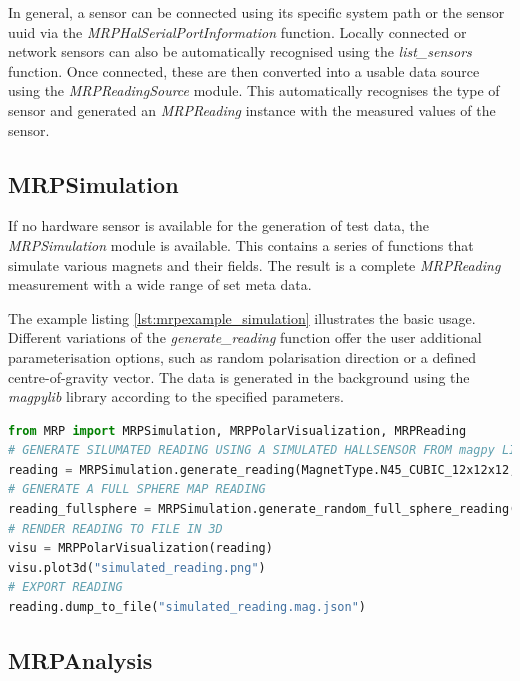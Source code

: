 In general, a sensor can be connected using its specific system path or
the sensor \gls{uuid} via the \emph{MRPHalSerialPortInformation}
function. Locally connected or network sensors can also be automatically
recognised using the \emph{list\_sensors} function. Once connected,
these are then converted into a usable data source using the
\emph{MRPReadingSource} module. This automatically recognises the type
of sensor and generated an \emph{MRPReading} instance with the measured
values of the sensor.

\hypertarget{mrpsimulation}{%
\subsection{MRPSimulation}\label{mrpsimulation}}

If no hardware sensor is available for the generation of test data, the
\emph{MRPSimulation} module is available. This contains a series of
functions that simulate various magnets and their fields. The result is
a complete \emph{MRPReading} measurement with a wide range of set meta
data.

The example listing \ref{lst:mrpexample_simulation} illustrates the
basic usage. Different variations of the \emph{generate\_reading}
function offer the user additional parameterisation options, such as
random polarisation direction or a defined centre-of-gravity vector. The
data is generated in the background using the \emph{magpylib}
 library according to the specified parameters.

\begin{lstlisting}[language=Python, caption={MRPSimulation example illustrates the usage of several functions how to generate simulated magnets}, label=lst:mrpexample_simulation]
from MRP import MRPSimulation, MRPPolarVisualization, MRPReading
# GENERATE SILUMATED READING USING A SIMULATED HALLSENSOR FROM magpy LIBRARY
reading = MRPSimulation.generate_reading(MagnetType.N45_CUBIC_12x12x12,_add_random_polarisation=True)
# GENERATE A FULL SPHERE MAP READING
reading_fullsphere = MRPSimulation.generate_random_full_sphere_reading()
# RENDER READING TO FILE IN 3D
visu = MRPPolarVisualization(reading)
visu.plot3d("simulated_reading.png")
# EXPORT READING
reading.dump_to_file("simulated_reading.mag.json")
\end{lstlisting}

\hypertarget{mrpanalysis}{%
\subsection{MRPAnalysis}\label{mrpanalysis}}

